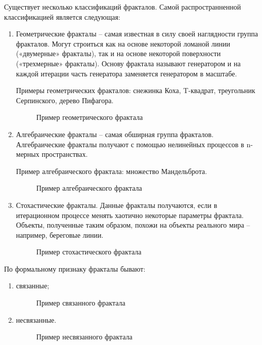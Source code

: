 Существует несколько классификаций фракталов. Самой распространненной классификацией является следующая: 
\\
\begin{enumerate}
\item Геометрические фракталы – самая известная в силу своей наглядности группа фракталов. Могут строиться как на основе некоторой ломаной линии («двумерные» фракталы), так и на основе некоторой поверхности («трехмерные» фракталы). Основу фрактала называют генератором и на каждой итерации часть генератора заменяется генератором в масштабе.


Примеры геометрических фракталов: снежинка Коха, T-квадрат, треугольник Серпинского, дерево Пифагора.


\begin{figure}[H]
\caption{Пример геометрического фрактала}
\label{ris:image}
\end{figure}

\item Алгебраические фракталы – самая обширная группа фракталов. Алгебраические фракталы получают с помощью нелинейных процессов в n-мерных пространствах. 

Пример алгебраического фрактала: множество Мандельброта.


\begin{figure}[H]
\caption{Пример алгебраического фрактала}
\label{ris:image}
\end{figure}


\item Стохастические фракталы. Данные фракталы получаются, если в итерационном процессе менять хаотично некоторые параметры фрактала. Объекты, полученные таким образом, похожи на объекты реального мира – например, береговые линии.


\begin{figure}[H]
\caption{Пример стохастического фрактала}
\label{ris:image}
\end{figure}

\end{enumerate}



По формальному признаку фракталы бывают: 
\\
\begin{enumerate}
\item связанные;


\begin{figure}[H]
\center{\texttt{[image: ss]}}
\caption{Пример связанного фрактала}
\label{ris:image}
\end{figure}

\item несвязанные.

\begin{figure}[H]
\caption{Пример несвязанного фрактала}
\label{ris:image}
\end{figure}

\end{enumerate}

